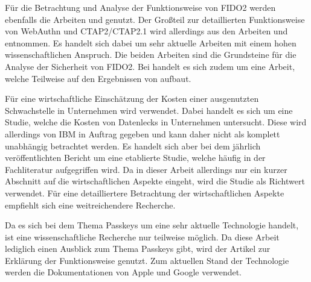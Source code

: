 Für die Betrachtung und Analyse der Funktionsweise von \ac{FIDO}2 werden ebenfalls die Arbeiten \cite{farke2020you} und \cite{lyastani2020fido2} genutzt. Der Großteil zur detaillierten Funktionsweise von WebAuthn und CTAP2/CTAP2.1 wird allerdings aus den Arbeiten \cite{barbosa2021provable} und \cite{bindel2022fido2} entnommen. Es handelt sich dabei um sehr aktuelle Arbeiten mit einem hohen wissenschaftlichen Anspruch. Die beiden Arbeiten sind die Grundsteine für die Analyse der Sicherheit von \ac{FIDO}2. Bei \cite{bindel2022fido2} handelt es sich zudem um eine Arbeit, welche Teilweise auf den Ergebnissen von \cite{barbosa2021provable} aufbaut.

Für eine wirtschaftliche Einschätzung der Kosten einer ausgenutzten Schwachstelle in Unternehmen wird \cite{databreach} verwendet. Dabei handelt es sich um eine Studie, welche die Kosten von Datenlecks in Unternehmen untersucht. Diese wird allerdings von IBM in Auftrag gegeben und kann daher nicht als komplett unabhängig betrachtet werden. Es handelt sich aber bei dem jährlich veröffentlichten Bericht um eine etablierte Studie, welche häufig in der Fachliteratur aufgegriffen wird. Da in dieser Arbeit allerdings nur ein kurzer Abschnitt auf die wirtschaftlichen Aspekte eingeht, wird die Studie als Richtwert verwendet. Für eine detailliertere Betrachtung der wirtschaftlichen Aspekte empfiehlt sich eine weitreichendere Recherche.

Da es sich bei dem Thema Passkeys um eine sehr aktuelle Technologie handelt, ist eine wissenschaftliche Recherche nur teilweise möglich. Da diese Arbeit lediglich einen Ausblick zum Thema Passkeys gibt, wird der Artikel \cite{usecasfido} zur Erklärung der Funktionsweise genutzt. Zum aktuellen Stand der Technologie werden die Dokumentationen von Apple \cite{passkeysapple} und Google \cite{passkeysgoogle} \cite{passkeysgoogledev} verwendet.